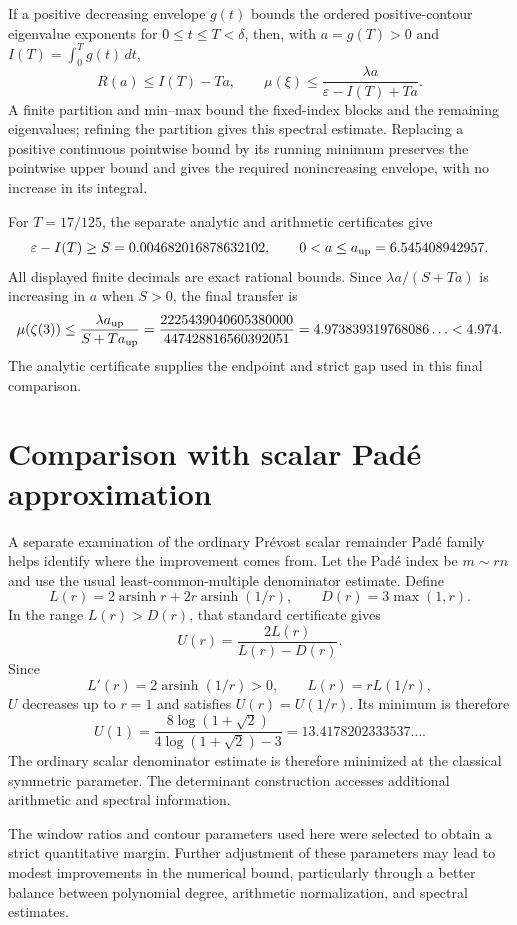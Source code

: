 \documentclass[11pt]{article}
\theoremstyle{definition}\newtheorem{definition}[theorem]{Definition}
\theoremstyle{remark}\newtheorem{remark}[theorem]{Remark}
\DeclareMathOperator{\arsinh}{arsinh}
\begin{document}
If a positive decreasing envelope $g(t)$ bounds the ordered
positive-contour eigenvalue exponents for $0\le t\le T<\delta$,
then, with $a=g(T)>0$ and $I(T)=\int_0^Tg(t)\,dt$,
\[
 R(a)\le I(T)-Ta,\qquad
 \mu(\xi)\le\frac{\lambda a}{\varepsilon-I(T)+Ta}.
\]
A finite partition and min--max bound the fixed-index blocks and
the remaining eigenvalues; refining the partition gives this
spectral estimate. Replacing a positive continuous pointwise bound by its running minimum preserves the pointwise upper bound and gives the required nonincreasing envelope, with no increase in its integral.

For $T=17/125$, the separate analytic and arithmetic certificates
give
\[
 \varepsilon-I(T)\ge S=0.004682016878632102,
 \qquad 0<a\le a_{\rm up}=6.545408942957.
\]
All displayed finite decimals are exact rational bounds. Since
$\lambda a/(S+Ta)$ is increasing in $a$ when $S>0$, the final
transfer is
\begin{equation}\label{zthree:finaltransfer}
 \mu(\zeta(3))\le
 \frac{\lambda a_{\rm up}}{S+Ta_{\rm up}}
 =\frac{2225439040605380000}{447428816560392051}
 =4.973839319768086\ldots<4.974.
\end{equation}
The analytic certificate supplies the endpoint and strict gap used in this final comparison.


\section{Comparison with scalar Pad\'e approximation}\label{sec:scalar}
A separate examination of the ordinary Pr\'evost scalar remainder Pad\'e family helps identify where the improvement comes from. Let the Pad\'e index be $m\sim rn$ and use the usual least-common-multiple denominator estimate. Define
\[
 L(r)=2\arsinh r+2r\arsinh(1/r),\qquad D(r)=3\max(1,r).
\]
In the range $L(r)>D(r)$, that standard certificate gives
\[
 U(r)=\frac{2L(r)}{L(r)-D(r)}.
\]
Since
\[
 L'(r)=2\arsinh(1/r)>0,\qquad L(r)=rL(1/r),
\]
$U$ decreases up to $r=1$ and satisfies $U(r)=U(1/r)$. Its minimum is therefore
\[
 U(1)=\frac{8\log(1+\sqrt2)}{4\log(1+\sqrt2)-3}
 =13.4178202333537\ldots.
\]
The ordinary scalar denominator estimate is therefore minimized at the classical symmetric parameter. The determinant construction accesses additional arithmetic and spectral information.

The window ratios and contour parameters used here were selected to obtain a strict quantitative margin. Further adjustment of these parameters may lead to modest improvements in the numerical bound, particularly through a better balance between polynomial degree, arithmetic normalization, and spectral estimates.
\end{document}
